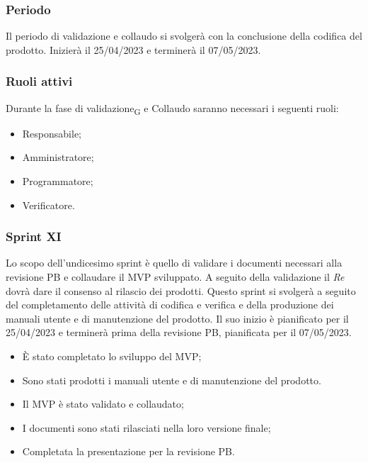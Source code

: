 \subsubsection{Periodo}
Il periodo di validazione e collaudo si svolgerà con la conclusione della codifica del prodotto. Inizierà il 25/04/2023 e terminerà il 07/05/2023.

\subsubsection{Ruoli attivi}
Durante la fase di validazione\textsubscript{G} e Collaudo saranno necessari i seguenti ruoli:
\begin{itemize}
	\item Responsabile;
	\item Amministratore;
	\item Programmatore;
	\item Verificatore.
\end{itemize}

\subsubsection{Sprint XI}
Lo scopo dell'undicesimo sprint è quello di validare i documenti necessari alla revisione PB e collaudare il MVP sviluppato. A seguito della validazione il \textit{Re} dovrà dare il consenso al rilascio dei prodotti.
Questo sprint si svolgerà a seguito del completamento delle attività di codifica e verifica e della produzione dei manuali utente e di manutenzione del prodotto. Il suo inizio è pianificato per il 25/04/2023 e terminerà prima della revisione PB, pianificata per il 07/05/2023.

\:
\begin{itemize}
	\item È stato completato lo sviluppo del MVP;
	\item Sono stati prodotti i manuali utente e di manutenzione del prodotto.
\end{itemize}

\:
\begin{itemize}
	\item Il MVP è stato validato e collaudato;
	\item I documenti sono stati rilasciati nella loro versione finale;
	\item Completata la presentazione per la revisione PB.
\end{itemize}

